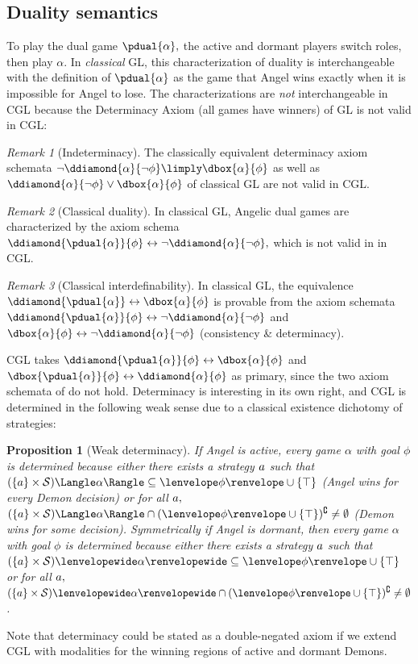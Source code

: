 \documentclass[12pt]{cmuthesis}
\newtheorem{proposition}[theorem]{Proposition}
\theoremstyle{definition}
\theoremstyle{remark}
\newtheorem{remark}{Remark}
\newcommand{\rref}[2][]{\prettyref{#2}}
\newcommand{\allstate}{\mathcal{S}}
\newcommand{\lequiv}{\leftrightarrow}
\newcommand{\CGL}{\textsf{CGL}\xspace}
\newcommand{\GL}{GL\xspace}
\begin{document}
\subsection{Duality semantics}
\label{sec:dual-sem}
To play the dual game $\pdual{\alpha},$ the active and dormant players switch roles, then play $\alpha$.
In \emph{classical} \GL, this characterization of duality is interchangeable with the definition of $\pdual{\alpha}$ as the game that Angel wins exactly when it is impossible for Angel to lose.
The characterizations are \emph{not} interchangeable in \CGL because the Determinacy Axiom (all games have winners) of \GL is not valid in \CGL:
\begin{remark}[Indeterminacy]
The classically equivalent determinacy axiom schemata
\(\lnot\ddiamond{\alpha}{\lnot\phi} \limply \dbox{\alpha}{\phi}\) as well as \(\ddiamond{\alpha}{\lnot\phi} \lor \dbox{\alpha}{\phi}\) of classical \GL are not valid in \CGL.
\end{remark}
\begin{remark}[Classical duality]
In classical \GL, Angelic dual games are characterized by the axiom schema $\ddiamond{\pdual{\alpha}}{\phi} \lequiv \neg \ddiamond{\alpha}{\neg \phi},$ which is not valid in in \CGL.
\label{rem:cdd}
\end{remark}
\begin{remark}[Classical interdefinability] \label{rem:consistencydeterminacyduality}
In classical \GL, the equivalence $\ddiamond{\pdual{\alpha}} \lequiv \dbox{\alpha}{\phi}$ is provable from the axiom schemata $\ddiamond{\pdual{\alpha}}{\phi} \lequiv \neg \ddiamond{\alpha}{\neg \phi}$ and $\dbox{\alpha}{\phi} \lequiv \neg \ddiamond{\alpha}{\neg \phi}$ (consistency \& determinacy).
\end{remark}
\CGL takes $\ddiamond{\pdual{\alpha}}{\phi} \lequiv \dbox{\alpha}{\phi}$  and $\dbox{\pdual{\alpha}}{\phi} \lequiv \ddiamond{\alpha}{\phi}$ as primary, since the two axiom schemata of \rref{rem:consistencydeterminacyduality} do not hold.
Determinacy is interesting in its own right, and \CGL is determined in the following weak sense due to a classical existence dichotomy of strategies:
\begin{proposition}[Weak determinacy]
If Angel is active, every game $\alpha$ with goal $\phi$ is determined because either 
there exists a strategy $\aa$ such that $\strategyforR[\alpha]{(\{\aa\} \times \allstate)} \subseteq \fintR{\phi} \cup \{\stt\}$ (Angel wins for every Demon decision) 
or for all $\aa,$ $\strategyforR[\alpha]{(\{\aa\} \times \allstate)}  \cap (\fintR{\phi} \cup \{\stt\})^\complement \neq \emptyset$ (Demon wins for some decision).
Symmetrically if Angel is dormant, then every game $\alpha$ with goal $\phi$ is determined because either 
there exists a strategy $\aa$ such that $\dstrategyforR[\alpha]{(\{\aa\} \times \allstate)} \subseteq \fintR{\phi} \cup \{\stt\}$
or for all $\aa,$ $\dstrategyforR[\alpha]{(\{\aa\} \times \allstate)}  \cap (\fintR{\phi} \cup \{\stt\})^\complement \neq \emptyset$.
\end{proposition}
Note that determinacy could be stated as a double-negated axiom if we extend \CGL with modalities for the winning regions of active and dormant Demons.
\end{document}
